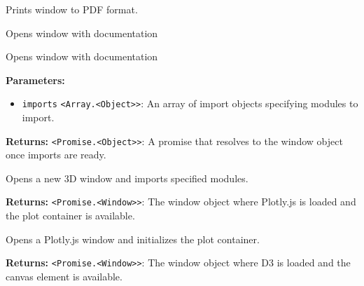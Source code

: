 \documentclass[12pt,a4paper]{article}
\begin{document}
\noindent Prints window to PDF format.

\vspace{5mm}
\noindent {}


\noindent Opens window with documentation

\vspace{5mm}
\noindent {}


\noindent Opens window with documentation

\vspace{5mm}
\noindent {}


\noindent \textbf{Parameters:}
\begin{itemize}
  \item \texttt{imports} \texttt{<Array.<Object>>}: An array of import objects specifying modules to import.
\end{itemize}

\noindent \textbf{Returns:} \texttt{<Promise.<Object>>}: A promise that resolves to the window object once imports are ready.

\noindent Opens a new 3D window and imports specified modules.

\vspace{5mm}
\noindent {}


\noindent \textbf{Returns:} \texttt{<Promise.<Window>>}: The window object where Plotly.js is loaded and the plot container is available.

\noindent Opens a Plotly.js window and initializes the plot container.

\vspace{5mm}
\noindent {}


\noindent \textbf{Returns:} \texttt{<Promise.<Window>>}: The window object where D3 is loaded and the canvas element is available.
\end{document}
